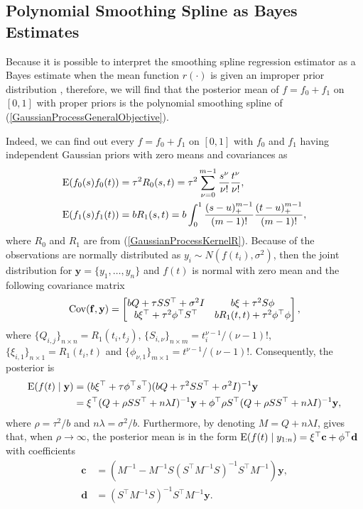 \subsection{Polynomial Smoothing Spline as Bayes Estimates}

Because it is possible to interpret the smoothing spline regression estimator as a Bayes estimate when the mean function $r(\cdot)$ is given an improper prior distribution \cite{wahba1990spline} \cite{berlinet2011reproducing}, therefore, we will find that the posterior mean of $f=f_0+f_1$ on $[0,1]$ with proper priors is the polynomial smoothing  spline of (\ref{GaussianProcessGeneralObjective}). 

Indeed, we can find out every $f=f_0+f_1$ on $[0,1]$ with $f_0$ and $f_1$ having independent Gaussian priors with zero means and covariances as 
\begin{align*}
\mathrm{E} (f_0(s)f_0(t)) &= \tau^2 R_0(s,t)=\tau^2 \sum_{\nu=0}^{m-1}\frac{s^\nu}{\nu!}\frac{t^\nu}{\nu!}, \\
\mathrm{E} (f_1(s)f_1(t)) &= bR_1(s,t) = b\int_{0}^{1} \frac{(s-u)_+^{m-1}}{(m-1)!} \frac{(t-u)_+^{m-1}}{(m-1)!},
\end{align*}
where $R_0$ and $R_1$ are from (\ref{GaussianProcessKernelR}). Because of the observations are normally distributed as $y_i\sim N(f(t_i),\sigma^2)$, then the joint distribution for $\mathbf{y} = \{y_1,\ldots,y_n\}$ and $f(t)$ is normal with zero mean and the following covariance matrix 
\begin{align*}\mathrm{Cov} (\mathbf{f},\mathbf{y}) = 
\begin{bmatrix}
bQ+\tau SS^\top+\sigma^2 I & b\xi +\tau^2 S\phi \\
b\xi^\top + \tau^2\phi^\top S^\top & bR_1(t,t) +\tau^2\phi^\top \phi
\end{bmatrix},
\end{align*}
where $\{Q_{i,j}\}_{n\times n}=R_1(t_i,t_j)$, $\{S_{i,\nu}\}_{n\times m}=t_i^{\nu-1}/(\nu-1)!$, $\{\xi_{i,1}\}_{n\times 1}=R_1(t_i,t)$ and $\{\phi_{\nu,1}\}_{m\times 1}=t^{\nu-1}/(\nu-1)!$. 
Consequently, the posterior is 
\begin{equation}
\begin{split}
\mathrm{E} (f(t)\mid\mathbf{y}) &= (b\xi^\top +\tau \phi^\top s^\top)(bQ+\tau^2 SS^\top+\sigma^2I)^{-1}\mathbf{y} \\
&= \xi^\top(Q+\rho SS^\top+n\lambda I)^{-1}\mathbf{y}+ \phi^\top\rho S^\top(Q+\rho SS^\top +n\lambda I)^{-1}\mathbf{y},
\end{split}
\end{equation}
where $\rho = \tau^2/b$ and $n\lambda=\sigma^2/b$. Furthermore, by denoting $M=Q+n\lambda I$, \cite{gu2013smoothing} gives that, when $\rho\rightarrow \infty$, the posterior mean is in the form $\mathrm{E}(f(t)\mid y_{1:n}) = \xi^\top\mathbf{c}+\phi^\top\mathbf{d}$ with coefficients
\begin{align}
\mathbf{c}&=(M^{-1}-M^{-1}S(S^\top M^{-1}S)^{-1}S^\top M^{-1})\mathbf{y},\\
\mathbf{d}&=(S^\top M^{-1}S)^{-1}S^\top M^{-1}\mathbf{y}.
\end{align}

